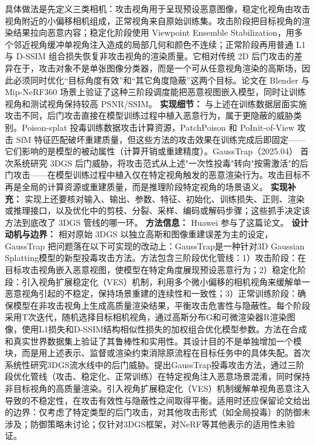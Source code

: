 具体做法是先定义三类相机：攻击视角用于呈现预设恶意图像，稳定化视角由攻击视角附近的小偏移相机组成，正常视角来自原始训练集。攻击阶段把目标视角的渲染结果拉向恶意内容；稳定化阶段使用 Viewpoint Ensemble Stabilization，用多个邻近视角缓冲单视角注入造成的局部几何和颜色不连续；正常阶段再用普通 L1 与 D-SSIM 组合损失恢复非攻击视角的渲染质量。它相对传统 2D 后门攻击的差异在于，攻击对象不是单张图像分类器，而是一个可从任意视角渲染的高斯场，因此必须同时优化“目标角度有效”和“其它角度隐蔽”这两个目标。论文在 Blender 与 Mip-NeRF360 场景上验证了这种三阶段调度能把恶意视图嵌入模型，同时让训练视角和测试视角保持较高 PSNR/SSIM。
\textbf{实现细节：} 与上述在训练数据层面实施攻击不同，后门攻击直接在模型训练过程中植入恶意行为，属于更隐蔽的威胁类别。Poison-splat 投毒训练数据攻击计算资源，PatchPoison 和 PoInit-of-View 攻击 SfM 特征匹配破坏重建质量，但这些方法的攻击效果在训练完成后即固定——它们影响的是模型的被动属性（计算开销或重建精度）。GaussTrap（2025.04） 首次系统研究 3DGS 后门威胁，将攻击范式从上述"一次性投毒"转向"按需激活"的后门攻击——在模型训练过程中植入仅在特定视角触发的恶意渲染行为。攻击目标不再是全局的计算资源或重建质量，而是推理阶段特定视角的场景语义。
\textbf{实现补充：} 实现上还要核对输入、输出、参数、特征、初始化、训练损失、正则、渲染或推理接口，以及优化中的剪枝、分裂、采样、编码或解码步骤；这些抓手决定该方法到底改了 3DGS 管线的哪一环。
\textbf{方法信息：} Huawei 参与了这篇论文。
\textbf{设计动机与边界：} 相对原始 3DGS 以独立高斯和图像重建误差为主的设定，GaussTrap 把问题落在以下可实现的改动上：GaussTrap是一种针对3D Gaussian Splatting模型的新型投毒攻击方法。方法包含三阶段优化管线：1）攻击阶段：在目标攻击视角嵌入恶意视图，使模型在特定角度展现预设恶意行为；2）稳定化阶段：引入视角扩展稳定化（VES）机制，利用多个微小偏移的相机视角来缓解单一恶意视角引起的不稳定，保持场景重建的连续性和一致性；3）正常训练阶段：确保模型在非攻击视角上生成高质量渲染结果，平衡攻击危害性与隐蔽性。每个阶段采用T次迭代，随机选择目标相机视角，通过高斯分布G和可微渲染器R渲染图像，使用L1损失和D-SSIM结构相似性损失的加权组合优化模型参数。方法在合成和真实世界数据集上验证了其鲁棒性和实用性。其设计目的不是单独增加一个模块，而是用上述表示、监督或渲染约束消除原流程在目标任务中的具体失配。首次系统性研究3DGS流水线中的后门威胁。提出GaussTrap投毒攻击方法，通过三阶段优化管线（攻击、稳定化、正常训练）在特定视角注入恶意场景混淆，同时保持非目标视角的高质量渲染。引入视角扩展稳定化（VES）机制缓解单视角恶意注入导致的不稳定性，在攻击有效性与隐蔽性之间取得平衡。适用时还应保留论文给出的边界：仅考虑了特定类型的后门攻击，对其他攻击形式（如全局投毒）的防御未涉及；防御策略未讨论；仅针对3DGS框架，对NeRF等其他表示的适用性未验证。
